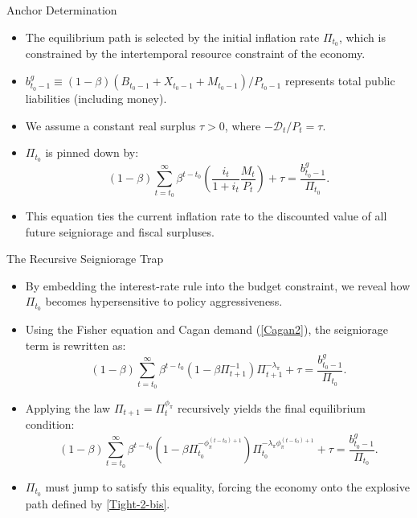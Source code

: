 \documentclass[11pt,aspectratio=169]{beamer}
\begin{document}
\begin{frame}{Anchor Determination}
\small


\begin{itemize}
    \item The equilibrium path is selected by the initial inflation rate $\Pi_{t_0}$, which is constrained by the intertemporal resource constraint of the economy.
    \item $b_{t_{0}-1}^{g} \equiv (1-\beta)(B_{t_{0}-1}+X_{t_{0}-1}+M_{t_{0}-1})/P_{t_{0}-1}$ represents total public liabilities (including money).
    \item We assume a constant real surplus $\tau > 0$, where $-\mathcal{D}_{t}/P_{t} = \tau$.
    \item $\Pi_{t_0}$ is pinned down by:
    \begin{equation}
    (1-\beta )\sum_{t=t_{0}}^{\infty }\beta ^{t-t_{0}}\left( \frac{i_{t}}{1+i_{t}}\frac{M_{t}}{P_{t}}\right) + \tau = \frac{b_{t_{0}-1}^{g}}{\Pi _{t_{0}}}. \label{Key-infl}
    \end{equation}
    \item This equation ties the current inflation rate to the discounted value of all future seigniorage and fiscal surpluses.
\end{itemize}
\end{frame}

\begin{frame}{The Recursive Seigniorage Trap}
\small


\begin{itemize}
    \item By embedding the interest-rate rule into the budget constraint, we reveal how $\Pi_{t_0}$ becomes hypersensitive to policy aggressiveness.
    \item Using the Fisher equation and Cagan demand (\ref{Cagan2}), the seigniorage term is rewritten as:
    \begin{equation*}
    (1-\beta )\sum_{t=t_{0}}^{\infty }\beta ^{t-t_{0}}\left( 1-\beta \Pi _{t+1}^{-1}\right) \Pi _{t+1}^{-\lambda _{\pi }} + \tau = \frac{b_{t_{0}-1}^{g}}{\Pi _{t_{0}}}.
    \end{equation*}
    \item Applying the law $\Pi _{t+1} = \Pi _{t}^{\phi _{\pi }}$ recursively yields the final equilibrium condition:
    \begin{equation}
    (1-\beta )\sum_{t=t_{0}}^{\infty }\beta ^{t-t_{0}}\left( 1-\beta \Pi _{t_{0}}^{-\phi _{\pi }^{(t-t_{0})+1}}\right) \Pi _{t_{0}}^{-\lambda _{\pi }\phi _{\pi }^{(t-t_{0})+1}} + \tau = \frac{b_{t_{0}-1}^{g}}{\Pi _{t_{0}}}. \label{Tight-1}
    \end{equation}
    \item $\Pi_{t_0}$ must jump to satisfy this equality, forcing the economy onto the explosive path defined by \eqref{Tight-2-bis}.
\end{itemize}
\end{frame}
\end{document}
